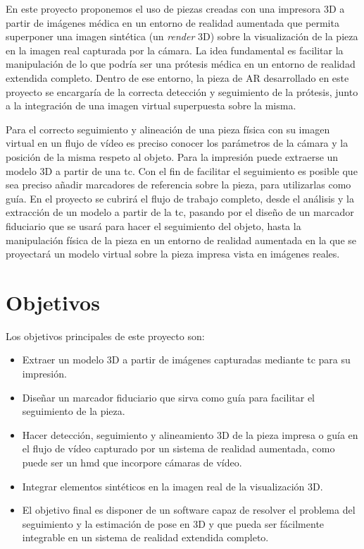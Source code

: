 En este proyecto proponemos el uso de piezas creadas con una impresora 3D a partir de imágenes médica en un entorno de realidad aumentada que permita superponer una imagen sintética (un \emph{render} 3D) sobre la visualización de la pieza en la imagen real capturada por la cámara. La idea fundamental es facilitar la manipulación de lo que podría ser una prótesis médica en un entorno de realidad extendida completo. Dentro de ese entorno, la pieza de AR desarrollado en este proyecto se encargaría de la correcta detección y seguimiento de la prótesis, junto a la integración de una imagen virtual superpuesta sobre la misma.

Para el correcto seguimiento y alineación de una pieza física con su imagen virtual en un flujo de vídeo es preciso conocer los parámetros de la cámara y la posición de la misma respeto al objeto. Para la impresión puede extraerse un modelo 3D a partir de una \acrfull{tc}. Con el fin de facilitar el seguimiento es posible que sea preciso añadir marcadores de referencia sobre la pieza, para utilizarlas como guía. En el proyecto se cubrirá el flujo de trabajo completo, desde el análisis y la extracción de un modelo a partir de la \acrshort{tc}, pasando por el diseño de un marcador fiduciario que se usará para hacer el seguimiento del objeto, hasta la manipulación física de la pieza en un entorno de realidad aumentada en la que se proyectará un modelo virtual sobre la pieza impresa vista en imágenes reales.

\section{Objetivos}
Los objetivos principales de este proyecto son:
\begin{itemize}
    \item Extraer un modelo 3D a partir de imágenes capturadas mediante \acrfull{tc} para su impresión. 
    \item Diseñar un marcador fiduciario que sirva como guía para facilitar el seguimiento de la pieza.
    \item Hacer detección, seguimiento y alineamiento 3D de la pieza impresa o guía en el flujo de vídeo capturado por un sistema de realidad aumentada, como puede ser un \acrshort{hmd} que incorpore cámaras de vídeo.
    \item Integrar elementos sintéticos en la imagen real de la visualización 3D.
    \item El objetivo final es disponer de un software capaz de resolver el problema del seguimiento y la estimación de pose en 3D y que pueda ser fácilmente integrable en un sistema de realidad extendida completo.
\end{itemize}

